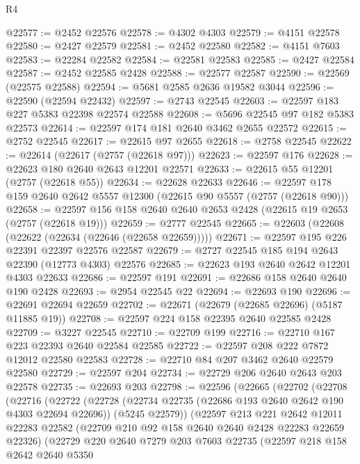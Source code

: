\begin{lexlean}{R4}
\begin{coremodule}
@22577 := @2452 @22576
@22578 := @4302 @4303
@22579 := @4151 @22578
@22580 := @2427 @22579
@22581 := @2452 @22580
@22582 := @4151 @7603
@22583 := @22284 @22582
@22584 := @22581 @22583
@22585 := @2427 @22584
@22587 := @2452 @22585 @2428
@22588 := @22577 @22587
@22590 := @22569 (@22575 @22588)
@22594 := @5681 @2585 @2636 @19582 @3044
@22596 := @22590 (@22594 @22432)
@22597 := @2743 @22545
@22603 := @22597 @183 @227 @5383 @22398 @22574 @22588
@22608 := @5696 @22545 @97 @182 @5383 @22573
@22614 := @22597 @174 @181 @2640 @3462 @2655 @22572
@22615 := @2752 @22545
@22617 := @22615 @97 @2655
@22618 := @2758 @22545
@22622 := @22614 (@22617 (@2757 (@22618 @97)))
@22623 := @22597 @176
@22628 := @22623 @180 @2640 @2643 @12201 @22571
@22633 := @22615 @55 @12201 (@2757 (@22618 @55))
@22634 := @22628 @22633
@22646 := @22597 @178 @159 @2640 @2642 @5557 @12300 (@22615 @90 @5557 (@2757 (@22618 @90)))
@22658 := @22597 @156 @158 @2640 @2640 @2653 @2428 (@22615 @19 @2653 (@2757 (@22618 @19)))
@22659 := @2777 @22545
@22665 := @22603 (@22608 (@22622 (@22634 (@22646 (@22658 @22659)))))
@22671 := @22597 @195 @226 @22391 @22397 @22576 @22587
@22679 := @2727 @22545 @185 @194 @2643 @22390 (@12773 @4303) @22576
@22685 := @22623 @193 @2640 @2642 @12201 @4303 @22633
@22686 := @22597 @191
@22691 := @22686 @158 @2640 @2640 @190 @2428
@22693 := @2954 @22545 @22
@22694 := @22693 @190
@22696 := @22691 @22694 @22659
@22702 := @22671 (@22679 (@22685 @22696) (@5187 @11885 @19))
@22708 := @22597 @224 @158 @22395 @2640 @22585 @2428
@22709 := @3227 @22545
@22710 := @22709 @199
@22716 := @22710 @167 @223 @22393 @2640 @22584 @22585
@22722 := @22597 @208 @222 @7872 @12012 @22580 @22583
@22728 := @22710 @84 @207 @3462 @2640 @22579 @22580
@22729 := @22597 @204
@22734 := @22729 @206 @2640 @2643 @203 @22578
@22735 := @22693 @203
@22798 := @22596
    (@22665
      (@22702
        (@22708
          (@22716
            (@22722
              (@22728
                (@22734 @22735 (@22686 @193 @2640 @2642 @190 @4303 @22694 @22696))
                (@5245 @22579))
              (@22597
                @213
                @221
                @2642
                @12011
                @22283
                @22582
                (@22709 @210 @92 @158 @2640 @2640 @2428 @22283 @22659 @22326)
                (@22729
                  @220
                  @2640
                  @7279
                  @203
                  @7603
                  @22735
                  (@22597
                    @218
                    @158
                    @2642
                    @2640
                    @5350

\end{coremodule}
\end{lexlean}
